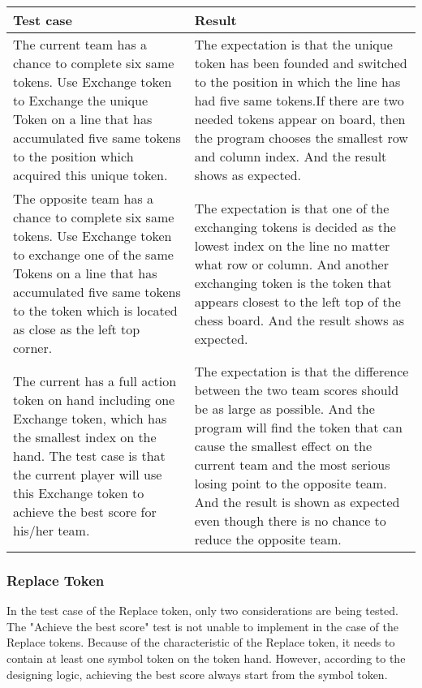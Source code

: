 \begin{table}[h]
	\centering
	\begin{tabular}{p{7cm}@{\hskip 5mm}  p{7cm}} 
		\toprule
		Test case   & Result   \\ 
		\midrule
		\midrule
		The current team has a chance to complete six same tokens. Use Exchange token to Exchange the unique Token on a line that has accumulated five same tokens to the position which acquired this unique token.  & The expectation is that the unique token has been founded and switched to the position in which the line has had five same tokens.If there are two needed tokens appear on board, then the program chooses the smallest row and column index. And the result shows as expected. \\
		\midrule
		The opposite team has a chance to complete six same tokens. Use Exchange token to exchange one of the same Tokens on a line that has accumulated five same tokens to the token which is located as close as the left top corner. & The expectation is that one of the exchanging tokens is decided as the lowest index on the line no matter what row or column. And another exchanging token is the token that appears closest to the left top of the chess board. And the result shows as expected.  \\
		\midrule
		The current has a full action token on hand including one Exchange token, which has the smallest index on the hand. The test case is that the current player will use this Exchange token to achieve the best score for his/her team. & The expectation is that the difference between the two team scores should be as large as possible. And the program will find the token that can cause the smallest effect on the current team and the most serious losing point to the opposite team. And the result is shown as expected even though there is no chance to reduce the opposite team.     \\
		\bottomrule
	\end{tabular}
\end{table}

\newpage
\subsubsection{Replace Token}
In the test case of the Replace token, only two considerations are being tested. The "Achieve the best score" test is not unable to implement in the case of the Replace tokens. Because of the characteristic of the Replace token, it needs to contain at least one symbol token on the token hand. However, according to the designing logic, achieving the best score always start from the symbol token.

